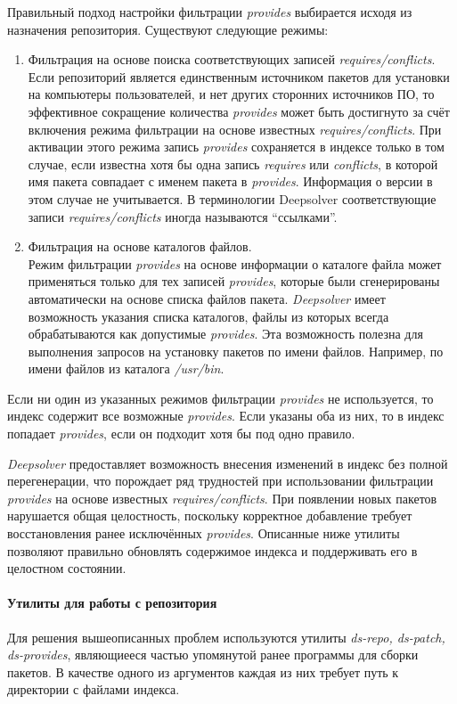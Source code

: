 Правильный подход настройки фильтрации \textit{provides} выбирается исходя
из назначения репозитория. Существуют следующие режимы:
\begin{enumerate}
\item{ Фильтрация на основе поиска соответствующих записей \textit{requires/conflicts}.\\
Если репозиторий является единственным источником пакетов для установки
на компьютеры пользователей, и нет других сторонних источников ПО, 
то эффективное сокращение количества \textit{provides} может быть
достигнуто за счёт включения режима фильтрации на основе известных
\textit{requires/conflicts}. При активации этого режима запись \textit{provides} сохраняется
в индексе только в том случае, если известна хотя бы одна запись
\textit{requires} или \textit{conflicts}, в которой имя пакета совпадает с именем пакета
в \textit{provides}. Информация о версии в этом случае не учитывается. В терминологии 
Deepsolver соответствующие записи \textit{requires/conflicts} иногда называются ``ссылками''.}
\item{ Фильтрация на основе каталогов файлов.\\
 Режим фильтрации \textit{provides} на основе информации о каталоге файла может применяться только для
тех записей \textit{provides}, которые были сгенерированы автоматически на основе
 списка файлов пакета. \textit{Deepsolver} имеет возможность указания списка
каталогов, файлы из которых всегда обрабатываются как допустимые
\textit{provides}. Эта возможность полезна для выполнения запросов на установку
 пакетов по имени файлов. Например, по имени файлов из каталога
\textit{/usr/bin}.}
\end{enumerate}
Если ни один из указанных режимов фильтрации \textit{provides} не используется,
то индекс содержит все возможные \textit{provides}. Если указаны оба из них, то
в индекс попадает \textit{provides}, если он подходит хотя бы под одно правило.

\textit{Deepsolver} предоставляет возможность внесения изменений в индекс без
полной перегенерации, что порождает ряд трудностей при использовании
фильтрации \textit{provides} на основе известных \textit{requires/conflicts}. При появлении
новых пакетов нарушается общая целостность, поскольку корректное добавление 
требует восстановления ранее исключённых \textit{provides}. Описанные ниже
утилиты позволяют правильно обновлять содержимое индекса и поддерживать
его в целостном состоянии.

\paragraph{Утилиты для работы с репозитория\\}
Для решения вышеописанных проблем используются утилиты \textit{ds-repo, ds-patch, ds-provides}\cite{deepsolver_um},
являющиееся частью упомянутой ранее программы для сборки пакетов.
В качестве одного из аргументов каждая из них требует путь к директории
 с файлами индекса.\\

